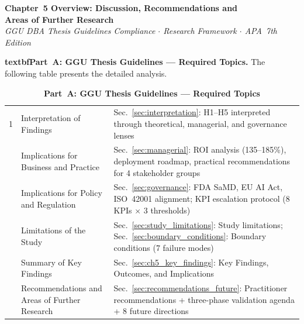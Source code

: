 
\thispagestyle{plain}

\begin{center}
{\large\bfseries\color{ggunavy} Chapter~5 Overview: Discussion, Recommendations and\\Areas of Further Research}\\[0.2cm]
{\small\textit{GGU DBA Thesis Guidelines Compliance $\cdot$ Research Framework $\cdot$ APA~7th Edition}}
\end{center}

\vspace{0.3cm}

\noindent\textbf{textbfPart~A: GGU Thesis Guidelines --- Required Topics.} The following table presents the detailed analysis.

\begin{table}[H]
\caption{Appendix Ch5 Ggu Checklist Table 1}
\tablestripes
\caption*{\textbf{Part~A: GGU Thesis Guidelines --- Required Topics}}
\tablefontsize
\begin{tabularx}{\textwidth}{@{} p{0.4cm} L L @{}}
\toprule
\thead{\#} &  &  \\
 & Interpretation of Findings & Sec.~\ref{sec:interpretation}: H1--H5 interpreted through theoretical, managerial, and governance lenses \\
 & Implications for Business and Practice & Sec.~\ref{sec:managerial}: ROI analysis (135--185\%), deployment roadmap, practical recommendations for 4 stakeholder groups \\
 & Implications for Policy and Regulation & Sec.~\ref{sec:governance}: FDA SaMD, EU AI Act, ISO~42001 alignment; KPI escalation protocol (8 KPIs $\times$ 3 thresholds) \\
 & Limitations of the Study & Sec.~\ref{sec:study_limitations}: Study limitations; Sec.~\ref{sec:boundary_conditions}: Boundary conditions (7 failure modes) \\
 & Summary of Key Findings & Sec.~\ref{sec:ch5_key_findings}: Key Findings, Outcomes, and Implications \\
 & Recommendations and Areas of Further Research & Sec.~\ref{sec:recommendations_future}: Practitioner recommendations + three-phase validation agenda + 8 future directions \\
\bottomrule
\end{tabularx}
\end{table}

